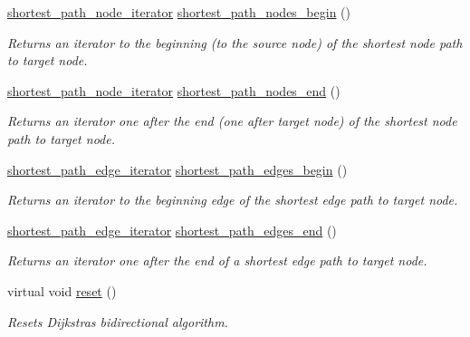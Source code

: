 \begin{DoxyCompactItemize}
\mbox{\hyperlink{classbid__dijkstra_a47d15051149b03179778a1553635b9d3}{shortest\+\_\+path\+\_\+node\+\_\+iterator}} \mbox{\hyperlink{classbid__dijkstra_a03807bf76c9a75f0e17e79d20d73f48d}{shortest\+\_\+path\+\_\+nodes\+\_\+begin}} ()
\begin{DoxyCompactList}\small\item\em Returns an iterator to the beginning (to the source node) of the shortest node path to target node. \end{DoxyCompactList}\item 
\mbox{\hyperlink{classbid__dijkstra_a47d15051149b03179778a1553635b9d3}{shortest\+\_\+path\+\_\+node\+\_\+iterator}} \mbox{\hyperlink{classbid__dijkstra_af06035d39e06a70a1c44f1c60c347c5a}{shortest\+\_\+path\+\_\+nodes\+\_\+end}} ()
\begin{DoxyCompactList}\small\item\em Returns an iterator one after the end (one after target node) of the shortest node path to target node. \end{DoxyCompactList}\item 
\mbox{\hyperlink{classbid__dijkstra_a12c551a4f2fea9d38d2b6488278e3a09}{shortest\+\_\+path\+\_\+edge\+\_\+iterator}} \mbox{\hyperlink{classbid__dijkstra_a177bf7ffd4bf83ce364076ab5183dc3e}{shortest\+\_\+path\+\_\+edges\+\_\+begin}} ()
\begin{DoxyCompactList}\small\item\em Returns an iterator to the beginning edge of the shortest edge path to target node. \end{DoxyCompactList}\item 
\mbox{\hyperlink{classbid__dijkstra_a12c551a4f2fea9d38d2b6488278e3a09}{shortest\+\_\+path\+\_\+edge\+\_\+iterator}} \mbox{\hyperlink{classbid__dijkstra_a0c31fda13205cd7905ff2400c60bb5e2}{shortest\+\_\+path\+\_\+edges\+\_\+end}} ()
\begin{DoxyCompactList}\small\item\em Returns an iterator one after the end of a shortest edge path to target node. \end{DoxyCompactList}\item 
virtual void \mbox{\hyperlink{classbid__dijkstra_a6df2769941bc73fc5626b084745a2258}{reset}} ()
\begin{DoxyCompactList}\small\item\em Resets Dijkstra\textquotesingle{}s bidirectional algorithm. \end{DoxyCompactList}\end{DoxyCompactItemize}
